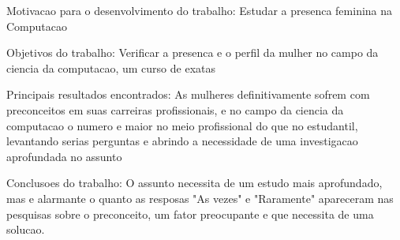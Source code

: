 Motivacao para o desenvolvimento do trabalho:
    Estudar a presenca feminina na Computacao

Objetivos do trabalho:
    Verificar a presenca e o perfil da mulher no campo da ciencia da computacao, um curso de exatas

Principais resultados encontrados:
    As mulheres definitivamente sofrem com preconceitos em suas carreiras profissionais, e no campo da ciencia da computacao o numero e maior no meio profissional do que no estudantil, levantando serias perguntas e abrindo a necessidade
    de uma investigacao aprofundada no assunto

Conclusoes do trabalho:
    O assunto necessita de um estudo mais aprofundado, mas e alarmante o quanto as resposas "As vezes" e "Raramente" apareceram nas pesquisas sobre o preconceito, um fator preocupante e que necessita de uma solucao.